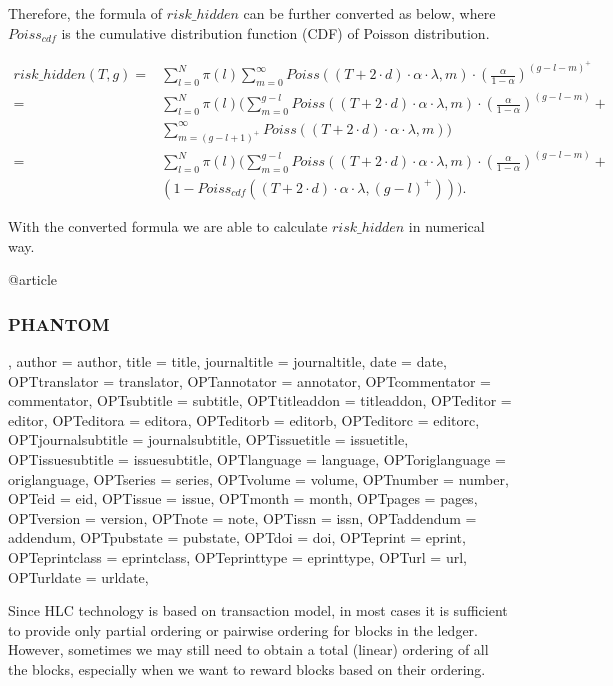 \documentclass[a4paper,11pt]{article}
\begin{document}
Therefore, the formula of $risk\_hidden$ can be further converted as below,
where $Poiss_{cdf}$ is the cumulative distribution function (CDF) of Poisson
distribution.

\begin{align*}
risk\_hidden(T,g)
=& \sum_{l=0}^{N}\pi(l)\sum_{m=0}^{\infty}Poiss((T+2 \cdot d) \cdot \alpha \cdot \lambda, m) \cdot (\frac{\alpha}{1-\alpha})^{(g-l-m)^+} \\
=& \sum_{l=0}^{N}\pi(l) (\sum_{m=0}^{g-l}Poiss((T+2 \cdot d) \cdot \alpha
	\cdot \lambda, m) \cdot (\frac{\alpha}{1-\alpha})^{(g-l-m)} + \\
& \sum_{m=(g-l+1)^+}^{\infty}Poiss((T+2 \cdot d) \cdot \alpha \cdot \lambda, m)) \\
=& \sum_{l=0}^{N}\pi(l) ( \sum_{m=0}^{g-l}Poiss((T+2 \cdot d) \cdot
	\alpha \cdot \lambda, m) \cdot (\frac{\alpha}{1-\alpha})^{(g-l-m)} + \\
& (1 - Poiss_{cdf} ((T+2 \cdot d) \cdot \alpha \cdot \lambda, (g-l)^+))).
\end{align*}

With the converted formula we are able to calculate $risk\_hidden$ in numerical way.

@article{\subsubsection{PHANTOM},
	author = {author},
	title = {title},
	journaltitle = {journaltitle},
	date = {date},
	OPTtranslator = {translator},
	OPTannotator = {annotator},
	OPTcommentator = {commentator},
	OPTsubtitle = {subtitle},
	OPTtitleaddon = {titleaddon},
	OPTeditor = {editor},
	OPTeditora = {editora},
	OPTeditorb = {editorb},
	OPTeditorc = {editorc},
	OPTjournalsubtitle = {journalsubtitle},
	OPTissuetitle = {issuetitle},
	OPTissuesubtitle = {issuesubtitle},
	OPTlanguage = {language},
	OPToriglanguage = {origlanguage},
	OPTseries = {series},
	OPTvolume = {volume},
	OPTnumber = {number},
	OPTeid = {eid},
	OPTissue = {issue},
	OPTmonth = {month},
	OPTpages = {pages},
	OPTversion = {version},
	OPTnote = {note},
	OPTissn = {issn},
	OPTaddendum = {addendum},
	OPTpubstate = {pubstate},
	OPTdoi = {doi},
	OPTeprint = {eprint},
	OPTeprintclass = {eprintclass},
	OPTeprinttype = {eprinttype},
	OPTurl = {url},
	OPTurldate = {urldate},
}


Since HLC technology is based on transaction model, in most cases it is
sufficient to provide only partial ordering or pairwise ordering for blocks in
the ledger. However, sometimes we may still need to obtain a total (linear)
ordering of all the blocks, especially when we want to reward blocks based on
their ordering. 
\end{document}

